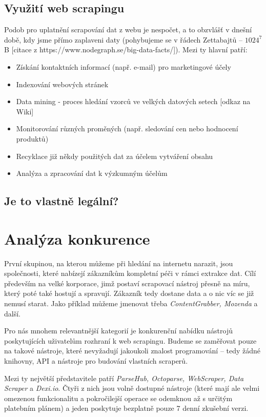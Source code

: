 \documentclass[thesis=B,czech]{FITthesis}[2012/06/26]
\begin{document}
\subsection{Využití web scrapingu}
Podob pro uplatnění scrapování dat z webu je nespočet, a to obzvláš\v{t} v dnešní době, kdy jsme přímo zaplaveni daty (pohybujeme se v řádech Zettabajtů -- $1024^{7}$ B [citace z https://www.nodegraph.se/big-data-facts/]). Mezi ty hlavní patří:
\begin{itemize}
	\item Získání kontaktních informací (např. e-mail) pro marketingové účely
	\item Indexování webových stránek
	\item Data mining - proces hledání vzorců ve velkých datových setech [odkaz na Wiki]
	\item Monitorování různých proměných (např. sledování cen nebo hodnocení produktů)
	\item Recyklace již někdy použitých dat za účelem vytváření  obsahu
	\item Analýza a zpracování dat k výzkumným účelům
\end{itemize}

\subsection{Je to vlastně legální?}


\newpage
\section{Analýza konkurence}
První skupinou, na kterou můžeme při hledání na internetu narazit, jsou společnosti, které nabízejí zákazníkům kompletní péči v rámci extrakce dat. Cílí především na velké korporace, jimž postaví scrapovací nástroj přesně na míru, který poté také hostují a spravují. Zákazník tedy dostane data a o nic víc se již nemusí starat. Jako příklad můžeme jmenovat třeba \emph{ContentGrabber, Mozenda} a další.

Pro nás mnohem relevantnější kategorií je konkurenční nabídku nástrojů poskytujících uživatelům rozhraní k web scrapingu. Budeme se zaměřovat pouze na takové nástroje, které nevyžadují jakoukoli znalost programování -- tedy žádné knihovny, API a nástroje pro budování vlastních scraperů.

Mezi ty největší představitele patří \emph{ParseHub, Octoparse, WebScraper, Data Scraper} a \emph{Dexi.io}. Čtyři z nich jsou volně dostupné nástroje (které mají ale velmi omezenou funkcionalitu a pokročilejší operace se odemknou až s určitým platebním plánem) a jeden poskytuje bezplatně pouze 7 denní zkušební verzi.
\end{document}
